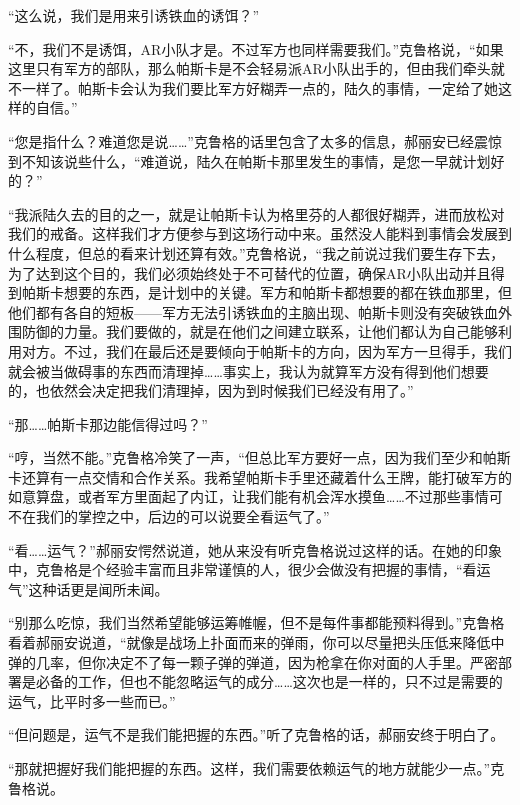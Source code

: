 “这么说，我们是用来引诱铁血的诱饵？”

“不，我们不是诱饵，AR小队才是。不过军方也同样需要我们。”克鲁格说，“如果这里只有军方的部队，那么帕斯卡是不会轻易派AR小队出手的，但由我们牵头就不一样了。帕斯卡会认为我们要比军方好糊弄一点的，陆久的事情，一定给了她这样的自信。”

“您是指什么？难道您是说……”克鲁格的话里包含了太多的信息，郝丽安已经震惊到不知该说些什么，“难道说，陆久在帕斯卡那里发生的事情，是您一早就计划好的？”

“我派陆久去的目的之一，就是让帕斯卡认为格里芬的人都很好糊弄，进而放松对我们的戒备。这样我们才方便参与到这场行动中来。虽然没人能料到事情会发展到什么程度，但总的看来计划还算有效。”克鲁格说，“我之前说过我们要生存下去，为了达到这个目的，我们必须始终处于不可替代的位置，确保AR小队出动并且得到帕斯卡想要的东西，是计划中的关键。军方和帕斯卡都想要的都在铁血那里，但他们都有各自的短板——军方无法引诱铁血的主脑出现、帕斯卡则没有突破铁血外围防御的力量。我们要做的，就是在他们之间建立联系，让他们都认为自己能够利用对方。不过，我们在最后还是要倾向于帕斯卡的方向，因为军方一旦得手，我们就会被当做碍事的东西而清理掉……事实上，我认为就算军方没有得到他们想要的，也依然会决定把我们清理掉，因为到时候我们已经没有用了。”

“那……帕斯卡那边能信得过吗？”

“哼，当然不能。”克鲁格冷笑了一声，“但总比军方要好一点，因为我们至少和帕斯卡还算有一点交情和合作关系。我希望帕斯卡手里还藏着什么王牌，能打破军方的如意算盘，或者军方里面起了内讧，让我们能有机会浑水摸鱼……不过那些事情可不在我们的掌控之中，后边的可以说要全看运气了。”

“看……运气？”郝丽安愕然说道，她从来没有听克鲁格说过这样的话。在她的印象中，克鲁格是个经验丰富而且非常谨慎的人，很少会做没有把握的事情，“看运气”这种话更是闻所未闻。

“别那么吃惊，我们当然希望能够运筹帷幄，但不是每件事都能预料得到。”克鲁格看着郝丽安说道，“就像是战场上扑面而来的弹雨，你可以尽量把头压低来降低中弹的几率，但你决定不了每一颗子弹的弹道，因为枪拿在你对面的人手里。严密部署是必备的工作，但也不能忽略运气的成分……这次也是一样的，只不过是需要的运气，比平时多一些而已。”

“但问题是，运气不是我们能把握的东西。”听了克鲁格的话，郝丽安终于明白了。

“那就把握好我们能把握的东西。这样，我们需要依赖运气的地方就能少一点。”克鲁格说。
